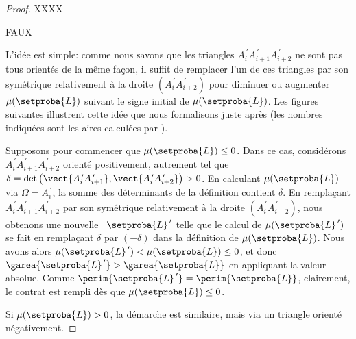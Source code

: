 \begin{proof}
	XXXX
	
	
	
	
	
	
	\newpage
	
	FAUX
	
	L'idée est simple: comme nous savons que les triangles $A^{\,\prime}_i A^{\,\prime}_{i+1} A^{\,\prime}_{i+2}$ ne sont pas tous orientés de la même façon, il suffit de remplacer l'un de ces triangles par son symétrique relativement à la droite $( A^{\,\prime}_i A^{\,\prime}_{i+2} )$ pour diminuer ou augmenter $\mu(\setproba{L})$ suivant le signe initial de $\mu(\setproba{L})$.
	Les figures suivantes illustrent cette idée que nous formalisons juste après
	(les nombres indiquées sont les aires calculées par \geogebra).
	
%	
%	
    
        
    Supposons pour commencer que $\mu(\setproba{L}) \leq 0$. Dans ce cas, considérons $A^{\,\prime}_i A^{\,\prime}_{i+1} A^{\,\prime}_{i+2}$ orienté positivement, autrement tel que
    $\delta = \det \big( \vect{A^{\,\prime}_i A^{\,\prime}_{i+1}} , \vect{A^{\,\prime}_i A^{\,\prime}_{i+2}} \big) > 0$.
    En calculant $\mu(\setproba{L})$ via $\Omega = A^{\,\prime}_i$, la somme des déterminants de la définition contient $\delta$.
    En remplaçant $A^{\,\prime}_i A^{\,\prime}_{i+1} A^{\,\prime}_{i+2}$ par son symétrique relativement à la droite $( A^{\,\prime}_i A^{\,\prime}_{i+2} )$, nous obtenons une nouvelle \nline\ $\setproba{L}^{\,\prime}$ telle que le calcul de $\mu(\setproba{L}^{\,\prime})$ se fait en remplaçant $\delta$ par $(- \delta)$ dans la définition de $\mu(\setproba{L})$.
    Nous avons alors $\mu(\setproba{L}^{\,\prime}) < \mu(\setproba{L}) \leq 0$, et donc
   	$\garea{\setproba{L}^{\,\prime}} > \garea{\setproba{L}}$ en appliquant la valeur absolue.
    Comme $\perim{\setproba{L}^{\,\prime}} = \perim{\setproba{L}}$, clairement, le contrat est rempli dès que $\mu(\setproba{L}) \leq 0$.
    
    Si $\mu(\setproba{L}) > 0$, la démarche est similaire, mais via un triangle orienté négativement.
\end{proof}


